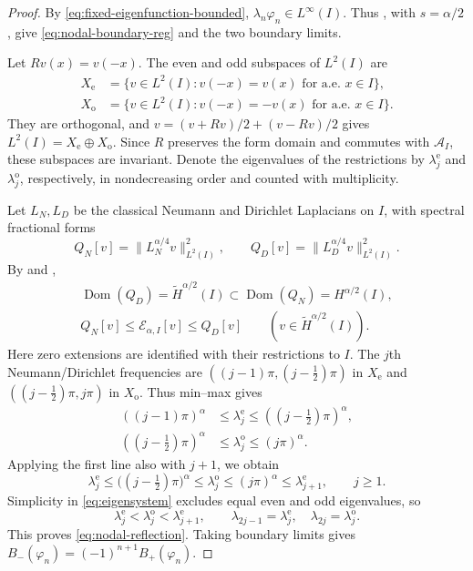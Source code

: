 \documentclass[11pt]{amsart}
\numberwithin{equation}{section}
\theoremstyle{remark}
\newcommand{\wt}{\widetilde}
\newcommand{\norm}[2][]{\lVert #2\rVert_{#1}}
\newcommand{\Dom}{\operatorname{Dom}}
\newcommand{\calE}{\mathcal E}
\begin{document}
\begin{proof}
By \eqref{eq:fixed-eigenfunction-bounded}, $\lambda_n\varphi_n\in L^\infty(I)$.
Thus \cite[Proposition~1.1 and Theorem~1.2]{RosOtonSerraRegularity}, with
$s=\alpha/2$, give \eqref{eq:nodal-boundary-reg} and the two boundary limits.

Let $Rv(x)=v(-x)$. The even and odd subspaces of $L^2(I)$ are
\[
 \begin{aligned}
 X_{\mathrm e}&=\{v\in L^2(I):v(-x)=v(x)\text{ for a.e. }x\in I\},\\
 X_{\mathrm o}&=\{v\in L^2(I):v(-x)=-v(x)\text{ for a.e. }x\in I\}.
 \end{aligned}
\]
They are orthogonal, and $v=(v+Rv)/2+(v-Rv)/2$ gives
$L^2(I)=X_{\mathrm e}\oplus X_{\mathrm o}$.
Since $R$ preserves the form domain and commutes with $\mathcal A_I$,
these subspaces are invariant. Denote the eigenvalues of the restrictions
by $\lambda_j^{\mathrm e}$ and $\lambda_j^{\mathrm o}$, respectively,
in nondecreasing order and counted with multiplicity.

Let $L_N,L_D$ be the classical Neumann and Dirichlet Laplacians on $I$,
with spectral fractional forms
\[
 Q_N[v]=\norm[L^2(I)]{L_N^{\alpha/4}v}^{2},\qquad
 Q_D[v]=\norm[L^2(I)]{L_D^{\alpha/4}v}^{2}.
\]
By \cite[Lemma~1 and Theorem~2]{MusinaNazarov} and
\cite[equation~(1) and Theorem~3]{NazarovComparison},
\[
 \begin{gathered}
 \Dom(Q_D)=\wt H^{\alpha/2}(I)
       \subset\Dom(Q_N)=H^{\alpha/2}(I),\\
 Q_N[v]\le\calE_{\alpha,I}[v]\le Q_D[v]
       \qquad(v\in\wt H^{\alpha/2}(I)).
 \end{gathered}
\]
Here zero extensions are identified with their restrictions to $I$.
The $j$th Neumann/Dirichlet frequencies are
$((j-1)\pi,(j-\tfrac12)\pi)$ in $X_{\mathrm e}$ and
$((j-\tfrac12)\pi,j\pi)$ in $X_{\mathrm o}$. Thus min--max gives
\[
 \begin{aligned}
 ((j-1)\pi)^\alpha
 &\le\lambda_j^{\mathrm e}\le((j-\tfrac12)\pi)^\alpha,\\
 ((j-\tfrac12)\pi)^\alpha
 &\le\lambda_j^{\mathrm o}\le(j\pi)^\alpha.
 \end{aligned}
\]
Applying the first line also with $j+1$, we obtain
\[
 \lambda_j^{\mathrm e}
 \le\bigl((j-\tfrac12)\pi\bigr)^\alpha
 \le\lambda_j^{\mathrm o}
 \le(j\pi)^\alpha
 \le\lambda_{j+1}^{\mathrm e},\qquad j\ge1.
\]
Simplicity in \eqref{eq:eigensystem} excludes equal even and odd eigenvalues, so
\[
 \lambda_j^{\mathrm e}<\lambda_j^{\mathrm o}<\lambda_{j+1}^{\mathrm e},
 \qquad
 \lambda_{2j-1}=\lambda_j^{\mathrm e},\quad
 \lambda_{2j}=\lambda_j^{\mathrm o}.
\]
This proves \eqref{eq:nodal-reflection}. Taking boundary limits gives
$B_-(\varphi_n)=(-1)^{n+1}B_+(\varphi_n)$.


\end{proof}
\end{document}
